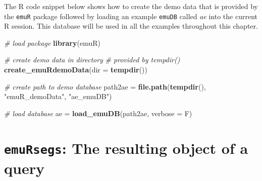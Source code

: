 \documentclass[]{book}
\newenvironment{Shaded}{\begin{snugshade}}{\end{snugshade}}
\newcommand{\CommentTok}[1]{\textcolor[rgb]{0.56,0.35,0.01}{\textit{#1}}}
\newcommand{\DataTypeTok}[1]{\textcolor[rgb]{0.13,0.29,0.53}{#1}}
\newcommand{\KeywordTok}[1]{\textcolor[rgb]{0.13,0.29,0.53}{\textbf{#1}}}
\newcommand{\NormalTok}[1]{#1}
\newcommand{\StringTok}[1]{\textcolor[rgb]{0.31,0.60,0.02}{#1}}
\theoremstyle{definition}
\theoremstyle{definition}
\theoremstyle{definition}
\theoremstyle{remark}
\begin{document}
The R code snippet below shows how to create the demo data that is
provided by the \texttt{emuR} package followed by loading an example
\texttt{emuDB} called \emph{ae} into the current R session. This
database will be used in all the examples throughout this chapter.

\begin{Shaded}
\begin{Highlighting}[]
\CommentTok{# load package}
\KeywordTok{library}\NormalTok{(emuR)}

\CommentTok{# create demo data in directory}
\CommentTok{# provided by tempdir()}
\KeywordTok{create_emuRdemoData}\NormalTok{(}\DataTypeTok{dir =} \KeywordTok{tempdir}\NormalTok{())}

\CommentTok{# create path to demo database}
\NormalTok{path2ae =}\StringTok{ }\KeywordTok{file.path}\NormalTok{(}\KeywordTok{tempdir}\NormalTok{(), }\StringTok{"emuR_demoData"}\NormalTok{, }\StringTok{"ae_emuDB"}\NormalTok{)}

\CommentTok{# load database}
\NormalTok{ae =}\StringTok{ }\KeywordTok{load_emuDB}\NormalTok{(path2ae, }\DataTypeTok{verbose =}\NormalTok{ F)}
\end{Highlighting}
\end{Shaded}

\hypertarget{sec:query-emuRsegs}{%
\section{\texorpdfstring{\texttt{emuRsegs}: The resulting object of a
query}{emuRsegs: The resulting object of a query}}\label{sec:query-emuRsegs}}
\end{document}
